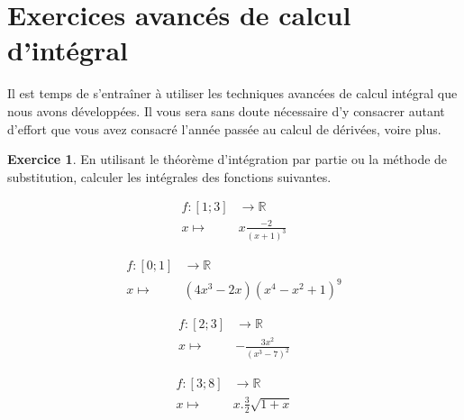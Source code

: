 \documentclass[a4paper,fontsize=13pt]{scrreprt}
\theoremstyle{plain}
\theoremstyle{definition}
\newtheorem{exo}[subsection]{Exercice}
\newtheorem*{solu}{Solution}
\newcommand{\rr}{\mathbb{R}}
\begin{document}
\section{Exercices avancés de calcul d'intégral}
Il est temps de s'entraîner à utiliser les techniques avancées de calcul intégral que nous avons développées. Il vous sera sans doute nécessaire d'y consacrer autant d'effort que vous avez consacré l'année passée au calcul de dérivées, voire plus.
\begin{exo}
En utilisant le théorème d'intégration par partie ou la méthode de substitution, calculer les intégrales des fonctions suivantes.
\begin{enumerate}
\begin{multicols}{2}
\item \begin{align*}
f : [1;3] &\to \rr \\
x \mapsto& x\frac{-2}{(x+1)^3}
\end{align*}
\item \begin{align*}
f : [0;1] &\to \rr \\
x \mapsto& (4x^3-2x)(x^4-x^2+1)^9
\end{align*}
\item \begin{align*}
f : [2;3] &\to \rr \\
x \mapsto& -\frac{3x^2}{(x^3-7)^2}
\end{align*}
\item \begin{align*}
f : [3;8] &\to \rr \\
x \mapsto& x.\frac{3}{2}\sqrt{1+x}
\end{align*}
\end{multicols}
\end{enumerate}
\end{exo}
\end{document}

